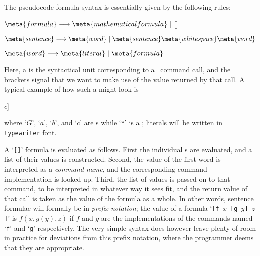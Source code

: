 \documentclass{mtmtcl}
\theoremstyle{plain}
\theoremstyle{remark}
\begin{document}
The pseudocode formula syntax is essentially given by the following 
rules:
\begin{displaysyntax}
  \(\meta{formula} \longrightarrow \meta{mathematical formula} \mid 
  {}\)[]\par
  \(\meta{sentence} \longrightarrow \meta{word} \mid
  \meta{sentence}\meta{whitespace}\meta{word}\)\par
  \(\meta{word} \longrightarrow \meta{literal} \mid \meta{formula}\)
\end{displaysyntax}
Here, a  is the syntactical unit corresponding to a 
\Tcl\ command call, and the brackets signal that we want to make use 
of the value returned by that call. A typical example of how such a 
 might look is
\begin{displaysyntax}
  [$G$ * [$G$ * $a$ $b$] $c$]
\end{displaysyntax}
where `$G$', `$a$', `$b$', and `$c$' are s 
while `\texttt{*}' is a ; literals will be written in 
\texttt{typewriter} font.

A `\texttt{[}\texttt{]}' formula is evaluated as 
follows. First the individual s are evaluated, and a list 
of their values is constructed. Second, the value of the first word 
is interpreted as a \emph{command name}, and the corresponding 
command implementation is looked up. Third, the list of values is 
passed on to that command, to be interpreted in whatever way it sees 
fit, and the return value of that call is taken as the value of the 
formula as a whole. In other words, sentence formulae will formally 
be in \emph{prefix notation}; the value of a formula `\texttt{[f $x$ 
[g $y$] $z$]}' is $f(x,g(y),z)$ if $f$ and $g$ are the implementations 
of the commands named `\texttt{f}' and `\texttt{g}' respectively. 
The very simple syntax does however leave plenty of room in practice 
for deviations from this prefix notation, where the programmer deems 
that they are appropriate.
\end{document}
